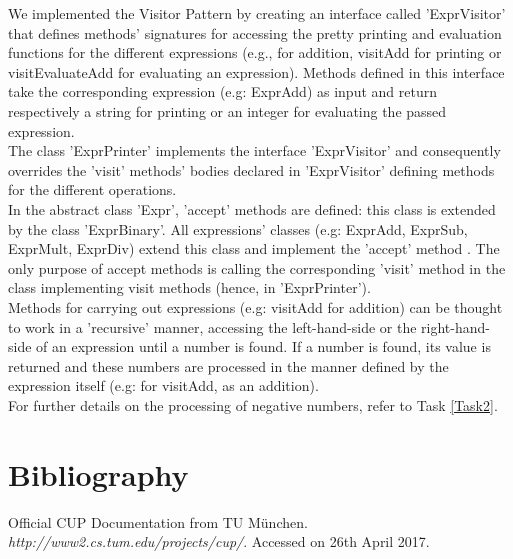 \documentclass[paper=a4, fontsize=11pt]{scrartcl}
\numberwithin{equation}{section}		%
\numberwithin{figure}{section}			%
\numberwithin{table}{section}				%
\begin{document}
We implemented the Visitor Pattern by creating an interface called 'ExprVisitor' that defines methods' signatures for accessing the pretty printing and evaluation functions for the different expressions (e.g., for addition, visitAdd for printing or visitEvaluateAdd for evaluating an expression). Methods defined in this interface take the corresponding expression (e.g: ExprAdd) as input and return respectively a string for printing or an integer for evaluating the passed expression.  \\
The class 'ExprPrinter' implements the interface 'ExprVisitor' and consequently overrides the 'visit' methods' bodies declared in 'ExprVisitor' defining methods for the different operations. \\
In the abstract class 'Expr', 'accept' methods are defined: this class is extended by the class 'ExprBinary'. All expressions' classes (e.g: ExprAdd, ExprSub, ExprMult, ExprDiv) extend this class and implement the 'accept' method . The only purpose of accept methods is calling the corresponding 'visit' method in the class implementing visit methods (hence, in 'ExprPrinter'). \\
Methods for carrying out expressions (e.g: visitAdd for addition) can be thought to work in a 'recursive' manner, accessing the left-hand-side or the right-hand-side of an expression until a number is found. If a number is found, its value is returned and these numbers are processed in the manner defined by the expression itself (e.g: for visitAdd, as an addition). \\
For further details on the processing of negative numbers, refer to Task \ref{Task2}.


 
\section*{Bibliography}
\begin{thebibliography}{9}%
Official CUP Documentation from TU M\"unchen. \textit{http://www2.cs.tum.edu/projects/cup/}. Accessed on 26th April 2017.
\end{thebibliography}
\end{document}
